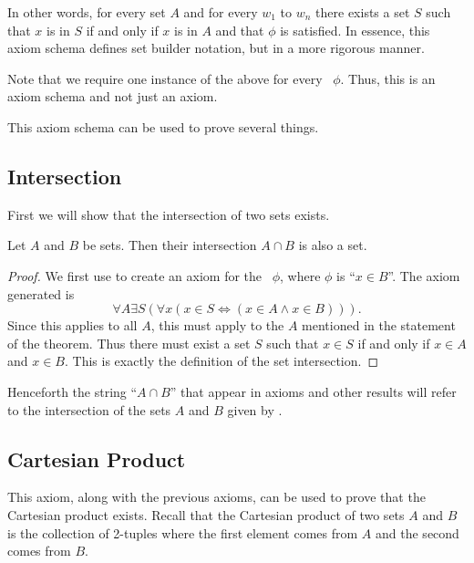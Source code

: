 In other words, for every set $A$ and for every $w_1$ to $w_n$ there exists a set $S$ such that $x$ is in $S$ if and only if $x$ is in $A$ and that $\phi$ is satisfied. In essence, this axiom schema defines set builder notation, but in a more rigorous manner.

Note that we require one instance of the above for every \wff~$\phi$. Thus, this is an axiom schema and not just an axiom.

This axiom schema can be used to prove several things.

\subsection{Intersection}
First we will show that the intersection of two sets exists.

\begin{theorem}\label{theorem:intersection-of-sets-is-a-set}
    Let $A$ and $B$ be sets. Then their intersection $A \cap B$ is also a set.
\end{theorem}
\begin{proof}
    We first use  to create an axiom for the \wff~$\phi$, where $\phi$ is ``$x \in B$''. The axiom generated is
    \[
        \forall A \exists S (\forall x (x \in S \iff (x \in A \land x \in B))).
    \]
    Since this applies to all $A$, this must apply to the $A$ mentioned in the statement of the theorem. Thus there must exist a set $S$ such that $x \in S$ if and only if $x \in A$ and $x \in B$. This is exactly the definition of the set intersection.
\end{proof}

Henceforth the string ``$A \cap B$'' that appear in axioms and other results will refer to the intersection of the sets $A$ and $B$ given by .

\subsection{Cartesian Product}
This axiom, along with the previous axioms, can be used to prove that the Cartesian product exists. Recall that the Cartesian product of two sets $A$ and $B$ is the collection of 2-tuples where the first element comes from $A$ and the second comes from $B$.


